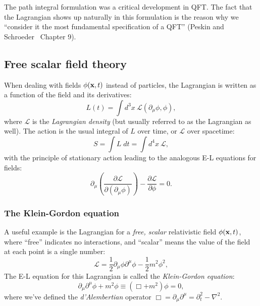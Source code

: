 The path integral formulation was a critical development in QFT.
The fact that the Lagrangian shows up naturally in this formulation is the reason why we ``consider it the most fundamental specification of a QFT'' (Peskin and Schroeder~\cite{Peskin:1995ev} Chapter 9).

\subsection{Free scalar field theory}
\label{sec:01_qft_classical_fsft}

When dealing with fields $\phi(\mathbf{x}, t)$ instead of particles, the Lagrangian is written as a function of the field and its derivatives:
\begin{equation}
	\label{eq:01_qft_field_lagrangian_density}
	L(t) = \int d^3x\ \mathcal{L}(\partial_\mu\phi, \phi),
\end{equation}
where $\mathcal{L}$ is the \textit{Lagrangian density} (but usually referred to as the Lagrangian as well).
The action is the usual integral of $L$ over time, or $\mathcal{L}$ over spacetime:
\begin{equation}
	\label{eq:01_qft_field_action}
	S = \int L\;dt = \int d^4x\ \mathcal{L},
\end{equation}
with the principle of stationary action leading to the analogous E-L equations for fields:
\begin{equation}
	\label{eq:01_qft_field_euler_lagrange}
	\partial_\mu\left(\frac{\partial\mathcal{L}}{\partial(\partial_\mu\phi)}\right) - \frac{\partial\mathcal{L}}{\partial\phi} = 0.
\end{equation}

\subsubsection{The Klein-Gordon equation}

A useful example is the Lagrangian for a \textit{free, scalar} relativistic field $\phi(\mathbf{x}, t)$, where ``free'' indicates no interactions, and ``scalar'' means the value of the field at each point is a single number:
\begin{equation}
	\label{eq:01_qft_field_kg_lagrangian}
	\mathcal{L} = \frac{1}{2}\partial_\mu\phi\partial^\mu\phi - \frac{1}{2}m^2\phi^2,
\end{equation}
The E-L equation for this Lagrangian is called the \textit{Klein-Gordon equation}:
\begin{equation}
	\label{eq:01_qft_field_kg_equation}
	\partial_\mu\partial^\mu\phi + m^2\phi \equiv (\Box + m^2)\phi = 0,
\end{equation}
where we've defined the \textit{d'Alembertian} operator $\Box = \partial_\mu\partial^\mu = \partial_t^2 - \nabla^2$.

